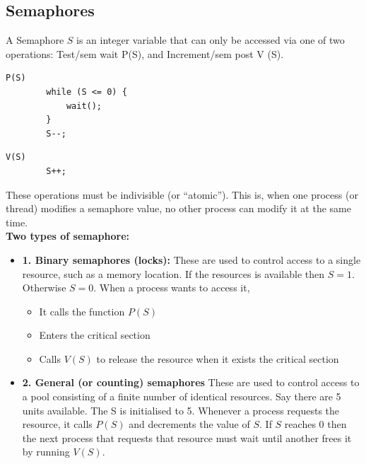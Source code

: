 \documentclass[a4paper, 10pt]{article}
\begin{document}
\subsection{Semaphores}
\begin{definitionbox}{}{}
    A Semaphore $S$ is an integer variable that can only be accessed via one of two operations: Test/sem wait P(S), and Increment/sem post V (S). \\
    \begin{minipage}{0.48\textwidth}
        \begin{lstlisting}[style=CStyle, caption={Test or Sem\_wait}]
        P(S)
        while (S <= 0) {
            wait();
        }
        S--; 
    \end{lstlisting}
    \end{minipage}
    \begin{minipage}{0.48\textwidth}
        \begin{lstlisting}[style=CStyle, caption={Test/Sem\_wait}]
        V(S)
        S++; 
    \end{lstlisting}
    \end{minipage}
\end{definitionbox}
\noindent These operations must be indivisible (or “atomic”). This is, when one process (or thread) modifies a semaphore value, no other process can modify it at the same time.\\[2ex]
\textbf{Two types of semaphore:}
\begin{itemize}
    \item \textbf{1. Binary semaphores (locks):} These are used to control access to a single resource, such as a memory location. If the resources is available then $S = 1$. Otherwise $S = 0$. When a process wants to access it,
          \begin{itemize}
              \item It calls the function $P(S)$
              \item Enters the critical section
              \item Calls $V(S)$ to release the resource when it exists the critical section
          \end{itemize}
    \item \textbf{2. General (or counting) semaphores}
          These are used to control access to a pool consisting of a finite number of identical resources. Say there are 5 units available. The S is initialised to 5. Whenever a process requests the resource, it calls $P(S)$ and decrements the value of $S$. If $S$ reaches $0$ then the next process that requests that resource must wait until another frees it by running $V(S)$.
\end{itemize}
\end{document}
